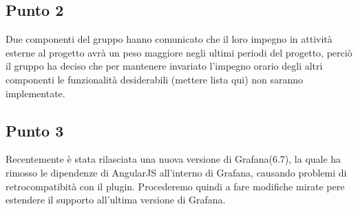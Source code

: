     \subsection{Punto 2}
    Due componenti del gruppo hanno comunicato che il loro impegno in attività esterne al progetto avrà un peso maggiore negli ultimi periodi del progetto, perciò il gruppo ha deciso che per mantenere invariato l'impegno orario degli altri componenti le funzionalità desiderabili (mettere lista qui) non saranno implementate.   
    \subsection{Punto 3}
    Recentemente è stata rilasciata una nuova versione di Grafana\glosp (6.7), la quale ha rimosso le dipendenze di AngularJS all'interno di Grafana\glo, causando problemi di retrocompatibità con il plugin. Procederemo quindi a fare modifiche mirate pere estendere il supporto all'ultima versione di Grafana\glo.

